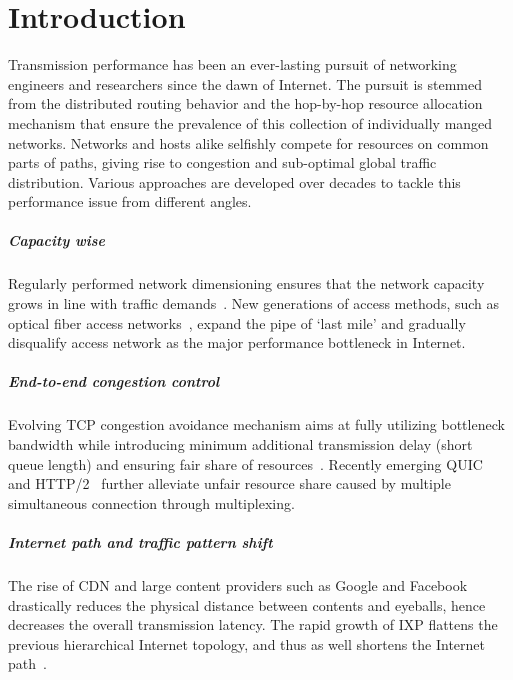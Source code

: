 \chapter{Introduction}
\label{sec:intro}

Transmission performance has been an ever-lasting pursuit of networking engineers and researchers since the dawn of Internet. 
The pursuit is stemmed from the distributed routing behavior and the hop-by-hop resource allocation mechanism that ensure the prevalence of this collection of individually manged networks.
Networks and hosts alike selfishly compete for resources on common parts of paths, giving rise to congestion and sub-optimal global traffic distribution.
Various approaches are developed over decades to tackle this performance issue from different angles.

\paragraph*{Capacity wise} Regularly performed network dimensioning ensures that the network capacity grows in line with traffic demands~\cite{pioro2004routing}. 
New generations of access methods, such as optical fiber access networks~\cite{Kramer2002, kazovsky2007next}, expand the pipe of `last mile' and gradually disqualify access network as the major performance bottleneck in Internet.

\paragraph*{End-to-end congestion control} Evolving TCP congestion avoidance mechanism aims at fully utilizing bottleneck bandwidth while introducing minimum additional transmission delay (short queue length) and ensuring fair share of resources~\cite{Jacobson1988, mathis1997macroscopic, Cardwell2016}.
Recently emerging QUIC~\cite{roskind2012quick} and HTTP/2~\cite{belshe2015hypertext} further alleviate unfair resource share caused by multiple simultaneous connection through multiplexing.

\paragraph*{Internet path and traffic pattern shift}
The rise of \acf{CDN} and large content providers such as Google and Facebook drastically reduces the physical distance between contents and eyeballs, hence decreases the overall transmission latency.
The rapid growth of \acf{IXP} flattens the previous hierarchical Internet topology, and thus as well shortens the Internet path~\cite{Labovitz2011}.

